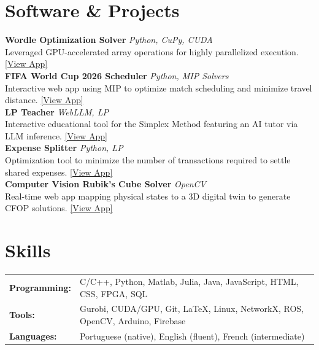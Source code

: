 \documentclass[letterpaper,10pt]{article}
\begin{document}
\section{Software \& Projects}
\textbf{Wordle Optimization Solver} \hfill \textit{Python, CuPy, CUDA} \\
Leveraged GPU-accelerated array operations for highly parallelized execution. \href{https://igorlucindo.github.io/wordle-optimization-GAME/}{\color{darkblue}[View App]} \\[3pt]
\textbf{FIFA World Cup 2026 Scheduler} \hfill \textit{Python, MIP Solvers} \\
Interactive web app using MIP to optimize match scheduling and minimize travel distance. \href{https://igorlucindo.github.io/fifa-world-cup-2026-scheduler-APP/}{\color{darkblue}[View App]} \\[3pt]
\textbf{LP Teacher} \hfill \textit{WebLLM, LP} \\
Interactive educational tool for the Simplex Method featuring an AI tutor via LLM inference. \href{https://igorlucindo.github.io/lp-teacher-APP/}{\color{darkblue}[View App]} \\[3pt]
\textbf{Expense Splitter} \hfill \textit{Python, LP} \\
Optimization tool to minimize the number of transactions required to settle shared expenses. \href{https://igorlucindo.github.io/expense-splitter-APP/}{\color{darkblue}[View App]} \\[3pt]
\textbf{Computer Vision Rubik's Cube Solver} \hfill \textit{OpenCV} \\
Real-time web app mapping physical states to a 3D digital twin to generate CFOP solutions. \href{https://igorlucindo.github.io/rubiks-cube-tutorial-APP/}{\color{darkblue}[View App]}

\section{Skills}
\begin{tabular}{@{}l l@{}}
    \textbf{Programming:} & C/C++, Python, Matlab, Julia, Java, JavaScript, HTML, CSS, FPGA, SQL \\
    \textbf{Tools:} & Gurobi, CUDA/GPU, Git, \LaTeX, Linux, NetworkX, ROS, OpenCV, Arduino, Firebase \\
    \textbf{Languages:} & Portuguese (native), English (fluent), French (intermediate) \\
\end{tabular}
\end{document}
